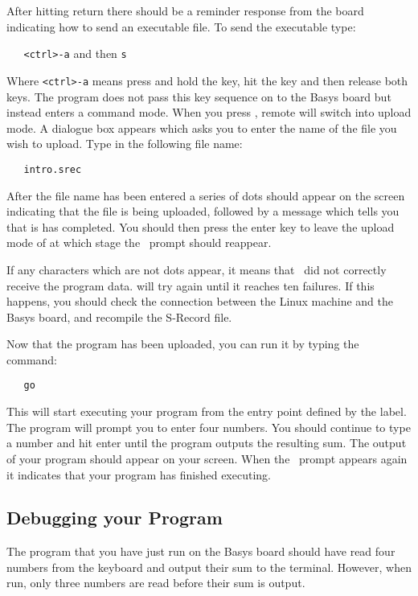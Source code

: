 After hitting return there should be a reminder response from the board
indicating how to send an executable file. To send the executable type:

\verb|   <ctrl>-a| and then \verb|s|

Where \verb|<ctrl>-a| means press and hold the  key, hit 
the  key and then release both keys.
The  program does not pass this key sequence on to the Basys 
board but instead enters a command mode. When you press , remote will
switch into upload mode. A dialogue box appears which asks you to enter the name
of the file you wish to upload. Type in the following file name:
\begin{verbatim}
   intro.srec
\end{verbatim}

After the file name has been entered a series of dots should appear on the 
screen indicating that the file is being uploaded, followed by a message which
tells you that is has completed. You should then press the enter key to
leave the upload mode of  at which stage the \WRAMPmon\ prompt 
should reappear.

If any characters which are not dots appear, it means that \WRAMPmon\ did not
correctly receive the program data.  will try again until it
reaches ten failures. If this happens, you should check the connection between
the Linux machine and the Basys board, and recompile the S-Record file.

Now that the program has been uploaded, you can run it by typing the command:
\begin{verbatim}
   go
\end{verbatim}

This will start executing your program from the entry point defined by the 
 label. The program will prompt you to enter four numbers. You
should continue to type a number and hit enter until the program outputs the
resulting sum. The output of your program should appear on your screen. When
the \WRAMPmon\ prompt appears again it indicates that your program has finished
executing.

\subsection{Debugging your Program}
\label{intro:debugging}
The program that you have just run on the Basys board should have read four
numbers from the keyboard and output their sum to the terminal. However, when
run, only three numbers are read before their sum is output.

